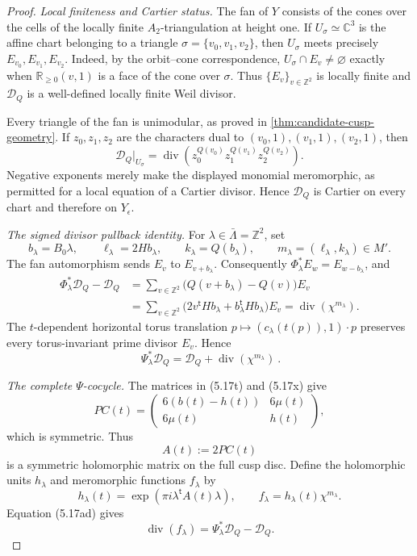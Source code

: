 \begin{proof}
\emph{Local finiteness and Cartier status.}
The fan of \(Y\) consists of the cones over the cells of the locally finite
\(A_2\)-triangulation at height one.  If
\(U_\sigma\simeq\mathbb C^3\) is the affine chart belonging to a triangle
\(\sigma=\{v_0,v_1,v_2\}\), then \(U_\sigma\) meets precisely
\(E_{v_0},E_{v_1},E_{v_2}\).  Indeed, by the orbit--cone
correspondence, \(U_\sigma\cap E_v\ne\varnothing\) exactly when
\(\mathbb R_{\geq0}(v,1)\) is a face of the cone over \(\sigma\).
Thus \(\{E_v\}_{v\in\mathbb Z^2}\) is locally finite and
\(\mathcal D_Q\) is a well-defined locally finite Weil divisor.

Every triangle of the fan is unimodular, as proved in
\cref{thm:candidate-cusp-geometry}.  If \(z_0,z_1,z_2\) are the
characters dual to
\((v_0,1),(v_1,1),(v_2,1)\), then
\[
 \mathcal D_Q|_{U_\sigma}
 =\operatorname{div}\!
   \left(z_0^{Q(v_0)}z_1^{Q(v_1)}z_2^{Q(v_2)}\right).
\tag{5.17ab}
\]
Negative exponents merely make the displayed monomial meromorphic, as
permitted for a local equation of a Cartier divisor.  Hence
\(\mathcal D_Q\) is Cartier on every chart and therefore on
\(Y_\epsilon\).

\emph{The signed divisor pullback identity.}
For \(\lambda\in\bar\Lambda=\mathbb Z^2\), set
\[
 b_\lambda=B_0\lambda,
 \qquad
 \ell_\lambda=2Hb_\lambda,
 \qquad
 k_\lambda=Q(b_\lambda),
 \qquad
 m_\lambda=(\ell_\lambda,k_\lambda)\in M'.
\tag{5.17ac}
\]
The fan automorphism sends \(E_v\) to \(E_{v+b_\lambda}\).
Consequently \(\Phi_\lambda^*E_w=E_{w-b_\lambda}\), and
\begin{align*}
 \Phi_\lambda^*\mathcal D_Q-\mathcal D_Q
 &=\sum_{v\in\mathbb Z^2}
   \bigl(Q(v+b_\lambda)-Q(v)\bigr)E_v\\
 &=\sum_{v\in\mathbb Z^2}
   \bigl(2v^{\mathsf t}Hb_\lambda+
         b_\lambda^{\mathsf t}Hb_\lambda\bigr)E_v
 =\operatorname{div}(\chi^{m_\lambda}).
\end{align*}
The \(t\)-dependent horizontal torus translation
\(p\mapsto(c_\lambda(t(p)),1)\cdot p\) preserves every
torus-invariant prime divisor \(E_v\).  Hence
\[
 \boxed{\ 
 \Psi_\lambda^*\mathcal D_Q
 =\mathcal D_Q+\operatorname{div}(\chi^{m_\lambda})\ }.
\tag{5.17ad}
\]

\emph{The complete \(\Psi\)-cocycle.}
The matrices in (5.17t) and (5.17x) give
\[
 PC(t)=
 \begin{pmatrix}
 6(b(t)-h(t))&6\mu(t)\\
 6\mu(t)&h(t)
 \end{pmatrix},
\tag{5.17ae}
\]
which is symmetric.  Thus
\[
 A(t):=2PC(t)
\tag{5.17af}
\]
is a symmetric holomorphic matrix on the full cusp disc.  Define the
holomorphic units \(h_\lambda\) and meromorphic functions \(f_\lambda\) by
\[
 h_\lambda(t)=
 \exp\!\left(\pi i\lambda^{\mathsf t}A(t)\lambda\right),
 \qquad
 f_\lambda=h_\lambda(t)\chi^{m_\lambda}.
\tag{5.17ag}
\]
Equation (5.17ad) gives
\[
 \operatorname{div}(f_\lambda)
 =\Psi_\lambda^*\mathcal D_Q-\mathcal D_Q.
\tag{5.17ah}
\]


\end{proof}

